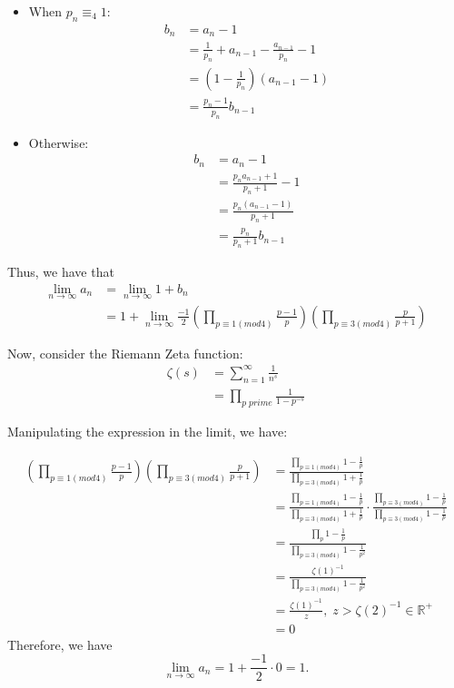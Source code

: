 \documentclass{article}
\begin{document}
\begin{enumerate}
\begin{itemize}
	\item When $p_n \equiv _4 1$:
	\begin{align*}
		b_n &= a_n - 1 \\ 
		&= \frac{1}{p_n} + a_{n - 1} - \frac{a_{n - 1}}{p_n} - 1 \\
        &= (1 - \frac{1}{p_n})(a_{n - 1} - 1) \\
        &= \frac{p_n - 1}{p_n} b_{n - 1}
	\end{align*}	
	 
	\item Otherwise:
	\begin{align*}
		b_n &= a_n - 1 \\ 
		&= \frac{p_n a_{n - 1} + 1}{p_n + 1} - 1 \\
        &= \frac{p_n(a_{n - 1} - 1)}{p_n + 1} \\
        &= \frac{p_n}{p_n + 1} b_{n - 1}
	\end{align*}	
\end{itemize}

Thus, we have that
\begin{align*}
\lim_{n \rightarrow \infty} a_n &= \lim_{n \rightarrow \infty} 1 + b_n \\
&= 1 + \lim_{n \rightarrow \infty} \frac{-1}{2} (\prod_{p \equiv 1 (mod 4)} \frac{p - 1}{p}) (\prod_{p \equiv 3 (mod 4)} \frac{p}{p + 1})
\end{align*}

Now, consider the Riemann Zeta function:
\begin{align*}
    \zeta (s) &= \sum_{n = 1}^{\infty} \frac{1}{n^s} \\
    &= \prod_{p \; prime} \frac{1}{1 - p^{-s}}
\end{align*}

Manipulating the expression in the limit, we have:

\begin{align*}
    (\prod_{p \equiv 1 (mod 4)} \frac{p - 1}{p}) (\prod_{p \equiv 3 (mod 4)} \frac{p}{p + 1}) &= \frac{\prod_{p \equiv 1 (mod 4)} 1 - \frac{1}{p}}{\prod_{p \equiv 3 (mod 4)} 1 + \frac{1}{p}}\\
    &= \frac{\prod_{p \equiv 1 (mod 4)} 1 - \frac{1}{p}}{\prod_{p \equiv 3 (mod 4)} 1 + \frac{1}{p}} \cdot \frac{\prod_{p \equiv 3 (mod 4)} 1 - \frac{1}{p}}{\prod_{p \equiv 3 (mod 4)} 1 - \frac{1}{p}}\\
    &= \frac{\prod_{p} 1 - \frac{1}{p}}{\prod_{p \equiv 3 (mod 4)} 1 - \frac{1}{p^2}}\\
    &= \frac{\zeta(1)^{-1}}{\prod_{p \equiv 3 (mod 4)} 1 - \frac{1}{p^2}} \\
    &= \frac{\zeta(1)^{-1}}{z}, \; z > \zeta(2)^{-1} \in \mathbb{R}^{+}\\
    &= 0
\end{align*}
    Therefore, we have
$$\lim_{n \rightarrow \infty} a_n = 1 + \frac{-1}{2} \cdot 0 = 1.$$
\end{enumerate}
\end{document}
